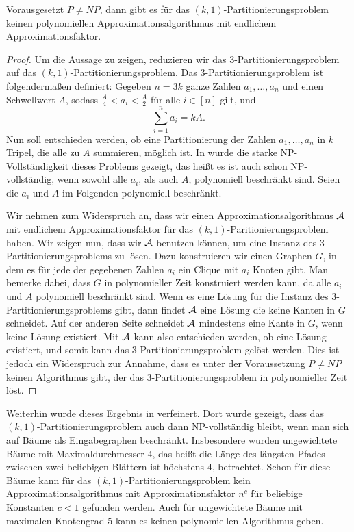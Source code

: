 \begin{thm}
    Vorausgesetzt $P \neq NP$, dann gibt es für das $(k,1)$-Partitionierungsproblem keinen polynomiellen Approximationsalgorithmus mit endlichem Approximationsfaktor.
\end{thm}
\begin{proof}
    Um die Aussage zu zeigen, reduzieren wir das $3$-Partitionierungsproblem auf das $(k,1)$-Partitionierungsproblem. 
    Das $3$-Partitionierungsproblem ist folgendermaßen definiert: Gegeben $n = 3k$ ganze Zahlen $a_1,\ldots, a_n$ und einen Schwellwert $A$, sodass $\frac{A}{4} < a_i < \frac{A}{2}$ für alle $i \in [n]$ gilt, und 
    \begin{equation*}
        \sum_{i=1}^{n} a_i = kA.
    \end{equation*}
    Nun soll entschieden werden, ob eine Partitionierung der Zahlen $a_1, \ldots, a_n$ in $k$ Tripel, die alle zu $A$ summieren, möglich ist. 
    In \parencite{gj79} wurde die starke NP-Vollständigkeit dieses Problems gezeigt, das heißt es ist auch schon NP-vollständig, wenn sowohl alle $a_i$, als auch $A$, polynomiell beschränkt sind.
    Seien die $a_i$ und $A$ im Folgenden polynomiell beschränkt.

    \noindent Wir nehmen zum Widerspruch an, dass wir einen Approximationsalgorithmus $\mathcal{A}$ mit endlichem Approximationsfaktor für das $(k,1)$-Paritionierungsproblem haben. 
    Wir zeigen nun, dass wir $\mathcal{A}$ benutzen können, um eine Instanz des $3$-Partitionierungsproblems zu lösen.
    Dazu konstruieren wir einen Graphen $G$, in dem es für jede der gegebenen Zahlen $a_i$ ein Clique mit $a_i$ Knoten gibt.
	Man bemerke dabei, dass $G$ in polynomieller Zeit konstruiert werden kann, da alle $a_i$ und $A$ polynomiell beschränkt sind.
    Wenn es eine Lösung für die Instanz des $3$-Partitionierungsproblems gibt, dann findet $\mathcal{A}$ eine Lösung die keine Kanten in $G$ schneidet. 
    Auf der anderen Seite schneidet $\mathcal{A}$ mindestens eine Kante in $G$, wenn keine Lösung existiert.
    Mit $\mathcal{A}$ kann also entschieden werden, ob eine Lösung existiert, und somit kann das $3$-Partitionierungsproblem gelöst werden.
    Dies ist jedoch ein Widerspruch zur Annahme, dass es unter der Voraussetzung $P \neq NP$ keinen Algorithmus gibt, der das $3$-Partitionierungsproblem in polynomieller Zeit löst.
\end{proof}

Weiterhin wurde dieses Ergebnis in \parencite{ff13} verfeinert. 
Dort wurde gezeigt, dass das $(k,1)$-Partitionierungsproblem auch dann NP-vollständig bleibt, wenn man sich auf Bäume als Eingabegraphen beschränkt.
Insbesondere wurden ungewichtete Bäume mit Maximaldurchmesser $4$, das heißt die Länge des längsten Pfades zwischen zwei beliebigen Blättern ist höchstens $4$, betrachtet.
Schon für diese Bäume kann für das $(k,1)$-Partitionierungsproblem kein Approximationsalgorithmus mit Approximationsfaktor $n^c$ für beliebige Konstanten $c < 1$ gefunden werden.
Auch für ungewichtete Bäume mit maximalen Knotengrad $5$ kann es keinen polynomiellen Algorithmus geben.

